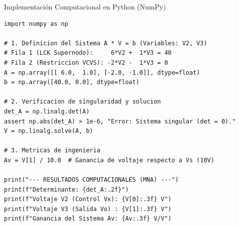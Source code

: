\documentclass[aspectratio=169, 10pt]{beamer}
\begin{document}
\begin{frame}[fragile]{Implementación Computacional en Python (NumPy)}
\begin{lstlisting}
import numpy as np

# 1. Definicion del Sistema A * V = b (Variables: V2, V3)
# Fila 1 (LCK Supernodo):     6*V2 +  1*V3 = 40
# Fila 2 (Restriccion VCVS): -2*V2 -  1*V3 = 0
A = np.array([[ 6.0,  1.0], [-2.0, -1.0]], dtype=float)
b = np.array([40.0, 0.0], dtype=float)

# 2. Verificacion de singularidad y solucion
det_A = np.linalg.det(A)
assert np.abs(det_A) > 1e-6, "Error: Sistema singular (det = 0)."
V = np.linalg.solve(A, b)

# 3. Metricas de ingenieria
Av = V[1] / 10.0  # Ganancia de voltaje respecto a Vs (10V)

print("--- RESULTADOS COMPUTACIONALES (MNA) ---")
print(f"Determinante: {det_A:.2f}")
print(f"Voltaje V2 (Control Vx): {V[0]:.3f} V")
print(f"Voltaje V3 (Salida Vo) : {V[1]:.3f} V")
print(f"Ganancia del Sistema Av: {Av:.3f} V/V")
\end{lstlisting}
\end{frame}
\end{document}
